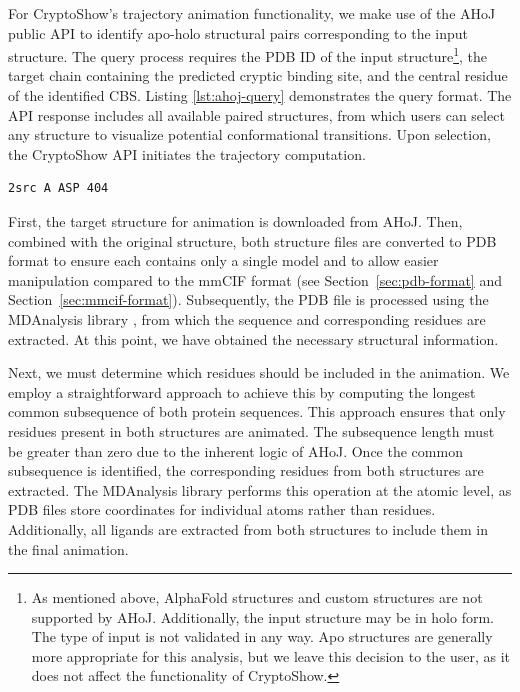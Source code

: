 For CryptoShow's trajectory animation functionality, we make use of the AHoJ public API to identify apo-holo structural pairs corresponding to the input structure. The query process requires the PDB ID of the input structure\footnote{As mentioned above, AlphaFold structures and custom structures are not supported by AHoJ. Additionally, the input structure may be in holo form. The type of input is not validated in any way. Apo structures are generally more appropriate for this analysis, but we leave this decision to the user, as it does not affect the functionality of CryptoShow.}, the target chain containing the predicted cryptic binding site, and the central residue of the identified CBS. Listing \ref{lst:ahoj-query} demonstrates the query format. The API response includes all available paired structures, from which users can select any structure to visualize potential conformational transitions. Upon selection, the CryptoShow API initiates the trajectory computation.

\begin{lstlisting}[caption={Sample query format for the AHoJ tool, specifically the 2SRC protein structure (Crystal Structure of Human Tyro\-sine-Protein Kinase C-SRC, in Complex with AMP-PNP), chain A, aspartic acid residue at position 404}, label={lst:ahoj-query}]
    2src A ASP 404
\end{lstlisting}

First, the target structure for animation is downloaded from AHoJ. Then, combined with the original structure, both structure files are converted to PDB format to ensure each contains only a single model and to allow easier manipulation compared to the mmCIF format (see Section~\ref{sec:pdb-format} and Section~\ref{sec:mmcif-format}). Subsequently, the PDB file is processed using the MDAnalysis library \cite{gowers2019mdanalysis}, from which the sequence and corresponding residues are extracted. At this point, we have obtained the necessary structural information.

Next, we must determine which residues should be included in the animation. We employ a straightforward approach to achieve this by computing the longest common subsequence of both protein sequences. This approach ensures that only residues present in both structures are animated. The subsequence length must be greater than zero due to the inherent logic of AHoJ. Once the common subsequence is identified, the corresponding residues from both structures are extracted. The MDAnalysis library performs this operation at the atomic level, as PDB files store coordinates for individual atoms rather than residues. Additionally, all ligands are extracted from both structures to include them in the final animation.


